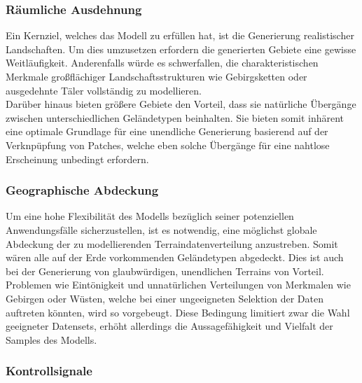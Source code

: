 \subsubsection {Räumliche Ausdehnung}

Ein Kernziel, welches das Modell zu erfüllen hat, ist die Generierung realistischer Landschaften. Um dies umzusetzen erfordern die generierten Gebiete eine gewisse Weitläufigkeit. Anderenfalls würde es schwerfallen, die charakteristischen Merkmale großflächiger Landschaftsstrukturen wie Gebirgsketten oder ausgedehnte Täler vollständig zu modellieren. \\
Darüber hinaus bieten größere Gebiete den Vorteil, dass sie natürliche Übergänge zwischen unterschiedlichen Geländetypen beinhalten. Sie bieten somit inhärent eine optimale Grundlage für eine unendliche Generierung basierend auf der Verknpüpfung von Patches, welche eben solche Übergänge für eine nahtlose Erscheinung unbedingt erfordern.  

\subsubsection {Geographische Abdeckung}
\label{subsubsec:Geographische_Abdeckung}

Um eine hohe Flexibilität des Modells bezüglich seiner potenziellen Anwendungsfälle sicherzustellen, ist es notwendig, eine möglichst globale Abdeckung der zu modellierenden Terraindatenverteilung anzustreben. Somit wären alle auf der Erde vorkommenden Geländetypen abgedeckt. Dies ist auch bei der Generierung von glaubwürdigen, unendlichen Terrains von Vorteil. Problemen wie Eintönigkeit und unnatürlichen Verteilungen von Merkmalen wie Gebirgen oder Wüsten, welche bei einer ungeeigneten Selektion der Daten auftreten könnten, wird so vorgebeugt. Diese Bedingung limitiert zwar die Wahl geeigneter Datensets, erhöht allerdings die Aussagefähigkeit und Vielfalt der Samples des Modells.  

\subsubsection {Kontrollsignale}

